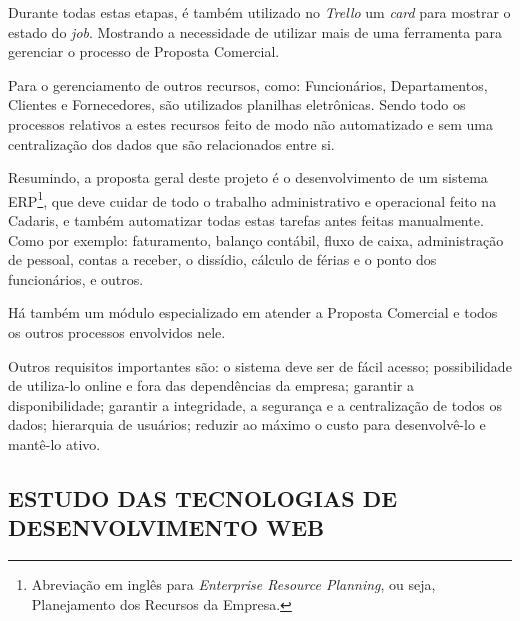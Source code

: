 \documentclass[
  12pt,            %
  openany,
  oneside,
  a4paper,         %
  english,      %
  brazil
]{article}
\numberwithin{figure}{section}
\numberwithin{table}{section}
\begin{document}
Durante todas estas etapas, é também utilizado no \textit{Trello} um \textit{card} para mostrar o estado do \textit{job}. Mostrando a necessidade de utilizar mais de uma ferramenta para gerenciar o processo de Proposta Comercial.

Para o gerenciamento de outros recursos, como: Funcionários, Departamentos, Clientes e Fornecedores, são utilizados planilhas eletrônicas. Sendo todo os processos relativos a estes recursos feito de modo não automatizado e sem uma centralização dos dados que são relacionados entre si.

Resumindo, a proposta geral deste projeto é o desenvolvimento de um sistema ERP\footnote{Abreviação em inglês para \textit{Enterprise Resource Planning}, ou seja, Planejamento dos Recursos da Empresa.}, que deve cuidar de todo o trabalho administrativo e operacional feito na Cadaris, e também automatizar todas estas tarefas antes feitas manualmente. Como por exemplo: faturamento, balanço contábil, fluxo de caixa, administração de pessoal, contas a receber, o dissídio, cálculo de férias e o ponto dos funcionários, e outros.

Há também um módulo especializado em atender a Proposta Comercial e todos os outros processos envolvidos nele.

Outros requisitos importantes são: o sistema deve ser de fácil acesso; possibilidade de utiliza-lo online e fora das dependências da empresa; garantir a disponibilidade; garantir a integridade, a segurança e a centralização de todos os dados; hierarquia de usuários; reduzir ao máximo o custo para desenvolvê-lo e mantê-lo ativo.







\subsection{ESTUDO DAS TECNOLOGIAS DE DESENVOLVIMENTO WEB}
\end{document}
